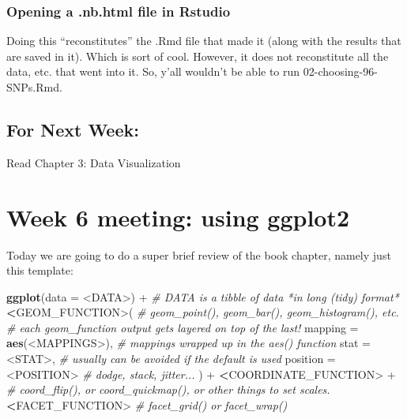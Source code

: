 \documentclass[]{book}
\newenvironment{Shaded}{\begin{snugshade}}{\end{snugshade}}
\newcommand{\KeywordTok}[1]{\textcolor[rgb]{0.13,0.29,0.53}{\textbf{{#1}}}}
\newcommand{\DataTypeTok}[1]{\textcolor[rgb]{0.13,0.29,0.53}{{#1}}}
\newcommand{\StringTok}[1]{\textcolor[rgb]{0.31,0.60,0.02}{{#1}}}
\newcommand{\CommentTok}[1]{\textcolor[rgb]{0.56,0.35,0.01}{\textit{{#1}}}}
\newcommand{\ErrorTok}[1]{\textcolor[rgb]{0.64,0.00,0.00}{\textbf{{#1}}}}
\newcommand{\NormalTok}[1]{{#1}}
\theoremstyle{definition}
\theoremstyle{definition}
\theoremstyle{remark}
\begin{document}
\subsection{Opening a .nb.html file in
Rstudio}\label{opening-a-.nb.html-file-in-rstudio}

Doing this ``reconstitutes'' the .Rmd file that made it (along with the
results that are saved in it). Which is sort of cool. However, it does
not reconstitute all the data, etc. that went into it. So, y'all
wouldn't be able to run 02-choosing-96-SNPs.Rmd.

\section{For Next Week:}\label{for-next-week}

Read Chapter 3: Data Visualization

\chapter{Week 6 meeting: using ggplot2}\label{ggplot2-intro-lecture}

Today we are going to do a super brief review of the book chapter,
namely just this template:

\begin{Shaded}
\begin{Highlighting}[]
\KeywordTok{ggplot}\NormalTok{(}\DataTypeTok{data =} \NormalTok{<DATA>) +}\StringTok{         }\CommentTok{# DATA is a tibble of data *in long (tidy) format*}
\StringTok{  }\ErrorTok{<}\NormalTok{GEOM_FUNCTION>(              }\CommentTok{# geom_point(), geom_bar(), geom_histogram(), etc. }
                                \CommentTok{# each geom_function output gets layered on top of the last!}
     \DataTypeTok{mapping =} \KeywordTok{aes}\NormalTok{(<MAPPINGS>), }\CommentTok{# mappings wrapped up in the aes() function}
     \DataTypeTok{stat =} \NormalTok{<STAT>,             }\CommentTok{# usually can be avoided if the default is used}
     \DataTypeTok{position =} \NormalTok{<POSITION>}\StringTok{      }\CommentTok{# dodge, stack, jitter...}
\StringTok{  }\NormalTok{) +}
\StringTok{  }\ErrorTok{<}\NormalTok{COORDINATE_FUNCTION>}\StringTok{ }\NormalTok{+}\StringTok{       }\CommentTok{# coord_flip(), or coord_quickmap(), or other things to set scales. }
\StringTok{  }\ErrorTok{<}\NormalTok{FACET_FUNCTION>}\StringTok{              }\CommentTok{# facet_grid() or facet_wrap()}
\end{Highlighting}
\end{Shaded}
\end{document}
